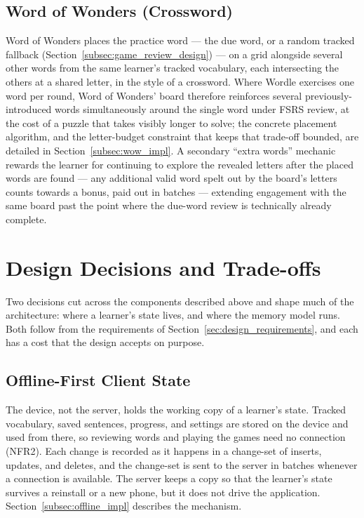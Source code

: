     \subsection{Word of Wonders (Crossword)}
    \label{subsec:wow_design}
    Word of Wonders places the practice word --- the due word, or a random tracked fallback (Section~\ref{subsec:game_review_design}) --- on a grid alongside several other words from the same learner's tracked vocabulary, each intersecting the others at a shared letter, in the style of a crossword. Where Wordle exercises one word per round, Word of Wonders' board therefore reinforces several previously-introduced words simultaneously around the single word under FSRS review, at the cost of a puzzle that takes visibly longer to solve; the concrete placement algorithm, and the letter-budget constraint that keeps that trade-off bounded, are detailed in Section~\ref{subsec:wow_impl}. A secondary ``extra words'' mechanic rewards the learner for continuing to explore the revealed letters after the placed words are found --- any additional valid word spelt out by the board's letters counts towards a bonus, paid out in batches --- extending engagement with the same board past the point where the due-word review is technically already complete.


\section{Design Decisions and Trade-offs}
\label{sec:design_decisions}
    Two decisions cut across the components described above and shape much of the architecture: where a learner's state lives, and where the memory model runs. Both follow from the requirements of Section~\ref{sec:design_requirements}, and each has a cost that the design accepts on purpose.

    \subsection{Offline-First Client State}
    \label{subsec:offline_first_design}
    The device, not the server, holds the working copy of a learner's state. Tracked vocabulary, saved sentences, progress, and settings are stored on the device and used from there, so reviewing words and playing the games need no connection (NFR2). Each change is recorded as it happens in a change-set of inserts, updates, and deletes, and the change-set is sent to the server in batches whenever a connection is available. The server keeps a copy so that the learner's state survives a reinstall or a new phone, but it does not drive the application. Section~\ref{subsec:offline_impl} describes the mechanism.

